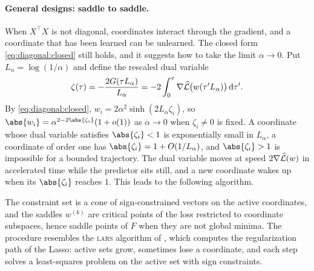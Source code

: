 \begin{refsection}
\paragraph{General designs: saddle to saddle.} When $X^\top X$ is not diagonal, coordinates interact through the gradient, and a coordinate that has been learned can be unlearned. The closed form \eqref{eq:diagonal:closed} still holds, and it suggests how to take the limit $\alpha\to0$. Put $L_\alpha=\log(1/\alpha)$ and define the rescaled dual variable
\[
  \zeta(\tau)=-\frac{2G(\tau L_\alpha)}{L_\alpha}=-2\int_0^\tau\nabla\widehat{\mathcal{L}}\bigl(w(\tau'L_\alpha)\bigr)\,\mathrm d\tau' .
\]
By \eqref{eq:diagonal:closed}, $w_i=2\alpha^2\sinh(2L_\alpha\zeta_i)$, so $\abs{w_i}=\alpha^{2-2\abs{\zeta_i}}(1+o(1))$ as $\alpha\to0$ when $\zeta_i\ne0$ is fixed. A coordinate whose dual variable satisfies $\abs{\zeta_i}<1$ is exponentially small in $L_\alpha$, a coordinate of order one has $\abs{\zeta_i}=1+O(1/L_\alpha)$, and $\abs{\zeta_i}>1$ is impossible for a bounded trajectory. The dual variable moves at speed $2\nabla\widehat{\mathcal{L}}(w)$ in accelerated time while the predictor sits still, and a new coordinate wakes up when its $\abs{\zeta_i}$ reaches $1$. This leads to the following algorithm.


The constraint set is a cone of sign-constrained vectors on the active coordinates, and the saddles $w^{(k)}$ are critical points of the loss restricted to coordinate subspaces, hence saddle points of $F$ when they are not global minima. The procedure resembles the \textsc{lars} algorithm of \textcite{EfronEtAl2004}, which computes the regularization path of the Lasso: active sets grow, sometimes lose a coordinate, and each step solves a least-squares problem on the active set with sign constraints.


\end{refsection}
